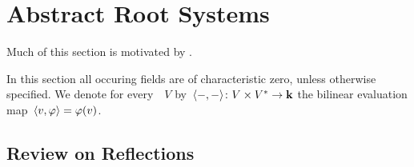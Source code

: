 \section{Abstract Root Systems}


\begin{fluff}
  Much of this section is motivated by \cite[\S18]{tauvel_yu}.
\end{fluff}




\begin{convention}
  In this section all occuring fields are of characteristic zero, unless otherwise specified.
  We denote for every~{\vectorspace{$\kf$}}~$V$ by~$\langle-,-\rangle \colon V \times V^* \to \mathbf{k}$ the bilinear evaluation map~$\langle v, \varphi\rangle = \varphi(v)$.
\end{convention}





\subsection{Review on Reflections}



